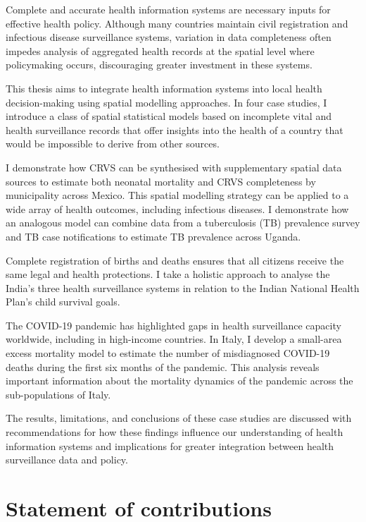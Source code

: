 \documentclass[
]{report}
\begin{document}
\begin{spacing}{1.15}

Complete and accurate health information systems are necessary inputs for effective health policy. Although many countries maintain civil registration and infectious disease surveillance systems, variation in data completeness often impedes analysis of aggregated health records at the spatial level where policymaking occurs, discouraging greater investment in these systems.

This thesis aims to integrate health information systems into local health decision-making using spatial modelling approaches. In four case studies, I introduce a class of spatial statistical models based on incomplete vital and health surveillance records that offer insights into the health of a country that would be impossible to derive from other sources.

I demonstrate how CRVS can be synthesised with supplementary spatial data sources to estimate both neonatal mortality and CRVS completeness by municipality across Mexico. This spatial modelling strategy can be applied to a wide array of health outcomes, including infectious diseases. I demonstrate how an analogous model can combine data from a tuberculosis (TB) prevalence survey and TB case notifications to estimate TB prevalence across Uganda.

Complete registration of births and deaths ensures that all citizens receive the same legal and health protections. I take a holistic approach to analyse the India's three health surveillance systems in relation to the Indian National Health Plan’s child survival goals.

The COVID-19 pandemic has highlighted gaps in health surveillance capacity worldwide, including in high-income countries. In Italy, I develop a small-area excess mortality model to estimate the number of misdiagnosed COVID-19 deaths during the first six months of the pandemic. This analysis reveals important information about the mortality dynamics of the pandemic across the sub-populations of Italy.

The results, limitations, and conclusions of these case studies are discussed with recommendations for how these findings influence our understanding of health information systems and implications for greater integration between health surveillance data and policy.

\end{spacing}

\hypertarget{statement-of-contributions}{%
\chapter*{Statement of contributions}\label{statement-of-contributions}}
\end{document}
